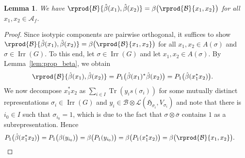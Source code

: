 \documentclass[11pt]{article}
\numberwithin{equation}{section}
\numberwithin{equation}{section}
\newtheorem{Lemma}[Theorem]{Lemma}
\newcommand*{\tensor}{\otimes}		%
\DeclareMathOperator{\Tr}{Tr}		%
\newcommand*{\hilb}{\mathfrak}		%
\newcommand*{\alg}{\mathcal}		%
\newcommand*{\hH}{\hilb{H}}			%
\newcommand*{\aA}{\alg{A}}			%
\newcommand*{\aB}{\alg{B}} 			%
\newcommand*{\End}{\mathcal{L}} %
\DeclareMathOperator{\Irrep}{Irr} 			%
\begin{document}
\begin{Lemma}\label{lem:beta_iso}
	We have $\rprod{\aB}{\hat\beta(x_1), \hat\beta(x_2)} = \beta\bigl( \rprod{\aB}{x_1, x_2} \bigr)$ for all $x_1, x_2 \in \aA_f$.
\end{Lemma}
\begin{proof}
	Since isotypic components are pairwise orthogonal, it suffices to show $\rprod{\aB}{\hat\beta(x_1), \hat\beta(x_2)} \allowbreak = \beta\bigl( \rprod{\aB}{x_1, x_2} \bigr)$ for all $x_1, x_2 \in A(\sigma)$ and $\sigma \in \Irrep(G)$.
	To this end, let $\sigma \in \Irrep(G)$ and let $x_1, x_2 \in A(\sigma)$.
	By Lemma~\ref{lem:prop_beta}, we obtain
	\begin{align*}
		\rprod{\aB}{\hat\beta(x_1), \hat\beta(x_2)}
		&=
		P_1\big( \hat\beta(x_1)^*\hat\beta(x_2) \big)
		=
		P_1\big( \hat\beta(x_1^*x_2) \big).
	\end{align*}
	We now decompose $x_1^*x_2$ as $\sum_{i \in I} \Tr( y_i s(\sigma_i) )$ for some mutually distinct representations $\sigma_i \in \Irrep(G)$ and $y_i \in \aB \tensor \End(\hH_{\sigma_i},V_{\sigma_i})$ and note that there is $i_0 \in I$ such that $\sigma_{i_0} = 1$, which is due to the fact that $\sigma \tensor \bar \sigma$ contains $1$ as a subrepresentation.
	Hence
	\begin{gather*}
		P_1\big( \hat\beta(x_1^*x_2) \big)
		=
		P_1\big( \beta(y_{i_0}) \big)
		=
		\beta\big( P_1(y_{i_0}) \big)
		=
		\beta\big( P_1(x_1^*x_2) \big)
		=
		\beta\bigl( \rprod{\aB}{x_1, x_2} \bigr).
		\tag*{\qed}
	\end{gather*}
	\renewcommand{\qed}{}
\end{proof}
\end{document}
